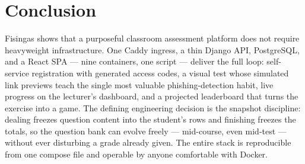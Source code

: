 \documentclass[11pt,a4paper]{article}
\begin{document}
\section{Conclusion}

Fisingas shows that a purposeful classroom assessment platform does
not require heavyweight infrastructure. One Caddy ingress, a thin
Django API, PostgreSQL, and a React SPA --- nine containers, one
script --- deliver the full loop: self-service registration with
generated access codes, a visual test whose simulated link previews
teach the single most valuable phishing-detection habit, live progress
on the lecturer's dashboard, and a projected leaderboard that turns
the exercise into a game. The defining engineering decision is the
snapshot discipline: dealing freezes question content into the
student's rows and finishing freezes the totals, so the question bank
can evolve freely --- mid-course, even mid-test --- without ever
disturbing a grade already given. The entire stack is reproducible
from one compose file and operable by anyone comfortable with Docker.
\end{document}
